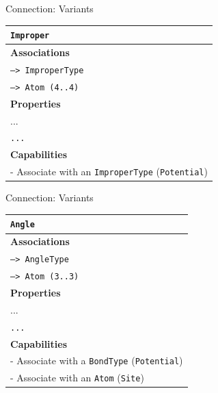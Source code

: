 \documentclass[xcolor=table]{beamer}
\begin{document}
\begin{frame}{Connection: Variants}
\begin{table}[ht]
    \centering
    \label{tab:ExampleConnections}

 \begin{tabular}{|l|}

         \hline
         \rowcolor{gray!50}
         \texttt{Improper}  \\
         \hline
         \textbf{Associations} \\
         \hline
         \texttt{--> ImproperType}\\
         \texttt{--> Atom (4..4)}\\
         \textbf{Properties}\\
         \hline
            ...\\
             \texttt{...}\\
         \hline
         \textbf{Capabilities}\\
         \hline
         - Associate with an \texttt{ImproperType} (\texttt{Potential})\\
        \hline
    \end{tabular}
\end{table}

\end{frame}

\begin{frame}{Connection: Variants}
\begin{table}[ht]
    \centering
    \label{tab:ExampleConnections}

\begin{tabular}{|l|}
         \hline
         \rowcolor{gray!50}
         \texttt{Angle}  \\
         \hline
         \textbf{Associations} \\
         \hline
         \texttt{--> AngleType}\\
          \texttt{--> Atom (3..3)}\\

         \textbf{Properties}\\
         \hline
            ...\\
         \texttt{...}\\
         \hline
         \textbf{Capabilities}\\
         \hline
         - Associate with a \texttt{BondType} (\texttt{Potential})\\
         - Associate with an \texttt{Atom} (\texttt{Site})\\
        \hline
    \end{tabular}
\end{table}

\end{frame}
\end{document}
